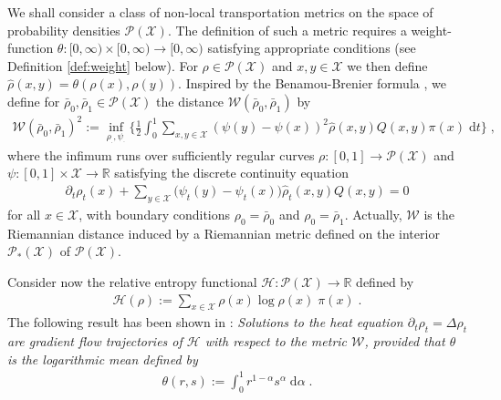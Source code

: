 \documentclass[a4paper,11pt,reqno]{amsart}
\theoremstyle{plain}
\theoremstyle{remark}
\numberwithin{equation}{section}
\begin{document}
We shall consider a class of non-local transportation metrics on the
space of probability densities ${{\mathscr{P}}({\mathcal{X}})}$. The definition of such a metric \cite{Ma11}
requires a weight-function $\theta : [0,\infty) \times [0,\infty) \to
[0,\infty)$ satisfying appropriate conditions (see Definition
\ref{def:weight} below). For $\rho \in {{\mathscr{P}}({\mathcal{X}})}$ and $x, y \in {\mathcal{X}}$ we then
define ${\hat\rho}(x,y) = \theta(\rho(x), \rho(y))$. Inspired by the
Benamou-Brenier formula \cite{BB00}, we define for $\bar\rho_0,
\bar\rho_1 \in {{\mathscr{P}}({\mathcal{X}})}$ the distance ${\mathcal{W}}(\bar\rho_0, \bar\rho_1 )$ by
\begin{align*}
  {\mathcal{W}}(\bar\rho_0, \bar\rho_1)^2 := 
  \inf_{\rho_\cdot, \psi_\cdot} \bigg\{ \frac12\int_0^1 \sum_{x,y\in {\mathcal{X}}} (\psi(y)-\psi(x))^2{\hat\rho}(x,y) Q(x,y) \pi(x){\; \mathrm{d}} t\bigg\}\;,
\end{align*}
where the infimum runs over sufficiently regular curves $\rho : [0,1]
\to {{\mathscr{P}}({\mathcal{X}})}$ and $\psi : [0,1] \times {\mathcal{X}} \to {{\mathbb R}}$ satisfying the discrete
continuity equation
\begin{align*}
 \partial_t \rho_t(x) 
         + \sum_{y \in {\mathcal{X}}}
         \big(\psi_t(y) - \psi_t(x)\big){\hat\rho}_t(x,y) Q(x,y) = 0
\end{align*}
for all $x \in {\mathcal{X}}$, with boundary conditions $\rho_0 = \bar\rho_0$
and $\rho_0 = \bar\rho_1$. Actually, ${\mathcal{W}}$ is the Riemannian distance
induced by a Riemannian metric defined on the interior ${{\mathscr{P}}_*({\mathcal{X}})}$ of
${{\mathscr{P}}({\mathcal{X}})}$. 

Consider now the relative entropy functional ${\mathcal{H}} : {{\mathscr{P}}({\mathcal{X}})} \to {{\mathbb R}}$ defined by 
\begin{align*}
 {\mathcal{H}}(\rho) := \sum_{x \in {\mathcal{X}}} \rho(x) \log \rho(x) \;\pi(x)\;.
\end{align*}
 The following result has been shown in
\cite{CHLZ11,Ma11,Mie11a}: \emph{Solutions to the heat equation
  $\partial_t \rho_t = \Delta \rho_t$ are gradient flow trajectories of
  ${\mathcal{H}}$ with respect to the metric ${\mathcal{W}}$, provided that $\theta$ is
  the \emph{logarithmic mean} defined by
\begin{align}\label{eq:log-mean-intro}
 \theta(r,s) := \int_0^1 r^{1-\alpha} s^\alpha {\; \mathrm{d}} \alpha\;.
\end{align}
}
\end{document}
